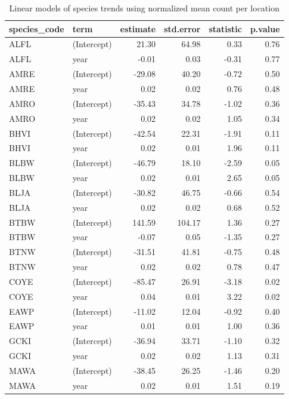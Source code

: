 \documentclass[
  letterpaper,
  DIV=11,
  numbers=noendperiod]{scrartcl}
\begin{document}
\begin{longtable}[]{@{}llrrrr@{}}

\caption{\label{tbl-normalized-count-mdm-year}Linear models of species
trends using normalized mean count per location}

\tabularnewline

\toprule\noalign{}
species\_code & term & estimate & std.error & statistic & p.value \\
\midrule\noalign{}
\endhead
\bottomrule\noalign{}
\endlastfoot
ALFL & (Intercept) & 21.30 & 64.98 & 0.33 & 0.76 \\
ALFL & year & -0.01 & 0.03 & -0.31 & 0.77 \\
AMRE & (Intercept) & -29.08 & 40.20 & -0.72 & 0.50 \\
AMRE & year & 0.02 & 0.02 & 0.76 & 0.48 \\
AMRO & (Intercept) & -35.43 & 34.78 & -1.02 & 0.36 \\
AMRO & year & 0.02 & 0.02 & 1.05 & 0.34 \\
BHVI & (Intercept) & -42.54 & 22.31 & -1.91 & 0.11 \\
BHVI & year & 0.02 & 0.01 & 1.96 & 0.11 \\
BLBW & (Intercept) & -46.79 & 18.10 & -2.59 & 0.05 \\
BLBW & year & 0.02 & 0.01 & 2.65 & 0.05 \\
BLJA & (Intercept) & -30.82 & 46.75 & -0.66 & 0.54 \\
BLJA & year & 0.02 & 0.02 & 0.68 & 0.52 \\
BTBW & (Intercept) & 141.59 & 104.17 & 1.36 & 0.27 \\
BTBW & year & -0.07 & 0.05 & -1.35 & 0.27 \\
BTNW & (Intercept) & -31.51 & 41.81 & -0.75 & 0.48 \\
BTNW & year & 0.02 & 0.02 & 0.78 & 0.47 \\
COYE & (Intercept) & -85.47 & 26.91 & -3.18 & 0.02 \\
COYE & year & 0.04 & 0.01 & 3.22 & 0.02 \\
EAWP & (Intercept) & -11.02 & 12.04 & -0.92 & 0.40 \\
EAWP & year & 0.01 & 0.01 & 1.00 & 0.36 \\
GCKI & (Intercept) & -36.94 & 33.71 & -1.10 & 0.32 \\
GCKI & year & 0.02 & 0.02 & 1.13 & 0.31 \\
MAWA & (Intercept) & -38.45 & 26.25 & -1.46 & 0.20 \\
MAWA & year & 0.02 & 0.01 & 1.51 & 0.19 \\

\end{longtable}
\end{document}
